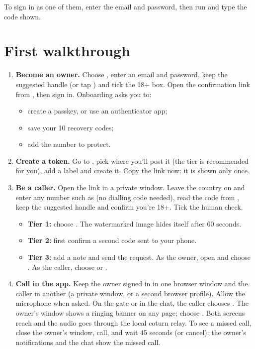 To sign in as one of them, enter the email and password, then run  and type the code shown.

\section{First walkthrough}

\begin{enumerate}
  \item \textbf{Become an owner.} Choose , enter an email and password, keep the suggested handle (or tap ) and tick the 18+ box. Open the confirmation link from , then sign in. Onboarding asks you to:
  \begin{itemize}
    \item create a passkey, or use an authenticator app;
    \item save your 10 recovery codes;
    \item add the number to protect.
  \end{itemize}
  \item \textbf{Create a token.} Go to , pick where you'll post it (the tier is recommended for you), add a label and create it. Copy the link now: it is shown only once.
  \item \textbf{Be a caller.} Open the link in a private window. Leave the country on  and enter any number such as  (no dialling code needed), read the code from , keep the suggested handle and confirm you're 18+. Tick the human check.
  \begin{itemize}
    \item \textbf{Tier 1:} choose . The watermarked image hides itself after 60 seconds.
    \item \textbf{Tier 2:} first confirm a second code sent to your phone.
    \item \textbf{Tier 3:} add a note and send the request. As the owner, open  and choose . As the caller, choose  or .
  \end{itemize}
  \item \textbf{Call in the app.} Keep the owner signed in in one browser window and the caller in another (a private window, or a second browser profile). Allow the microphone when asked. On the gate or in the chat, the caller chooses . The owner's window shows a ringing banner on any page; choose . Both screens reach  and the audio goes through the local coturn relay. To see a missed call, close the owner's window, call, and wait 45 seconds (or cancel): the owner's notifications and the chat show the missed call.

\end{enumerate}
